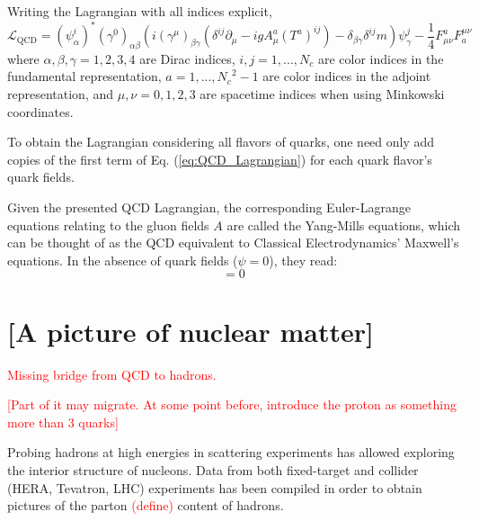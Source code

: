 Writing the Lagrangian with all indices explicit,
\begin{equation}
	\mathcal{L}_{\text{QCD}} = \left(\psi_\alpha^i \right)^*  \left( \gamma^0  \right)_{\alpha \beta} \left(i \left(\gamma^\mu \right)_{\beta \gamma} \left( \delta^{ij} \partial_\mu - i g A^a_\mu \left( T^a \right)^{ij} \right) - \delta_{\beta \gamma} \delta^{ij} m \right) \psi_\gamma^j - \frac{1}{4} F_{\mu \nu}^a F^{\mu \nu}_a
	\label{eq:QCD_Lagrangian_Indices}
\end{equation}
where $\alpha, \beta, \gamma = 1,2,3,4$ are Dirac indices, $i,j=1, ..., N_c$ are color indices in the fundamental representation, $a = 1, ..., {N_c}^2-1$ are color indices in the adjoint representation, and $\mu,\nu = 0,1,2,3$ are spacetime indices when using Minkowski coordinates.

To obtain the Lagrangian considering all flavors of quarks, one need only add copies of the first term of Eq. (\ref{eq:QCD_Lagrangian}) for each quark flavor's quark fields.

Given the presented QCD Lagrangian, the corresponding Euler-Lagrange equations relating to the gluon fields $A$ are called the Yang-Mills equations, which can be thought of as the QCD equivalent to Classical Electrodynamics' Maxwell's equations.
In the absence of quark fields ($\psi=0$), they read:
\begin{equation}
	[D_\mu, F^{\mu \nu}] = 0
	\label{eq:homogenous_Yang-Mills}
\end{equation}

\section{[A picture of nuclear matter]}
\label{sec:nuclear_matter}

\textcolor{red}{Missing bridge from QCD to hadrons.}

\textcolor{red}{[Part of it may migrate. At some point before, introduce the proton as something more than 3 quarks]}

Probing hadrons at high energies in scattering experiments has allowed exploring the interior structure of nucleons. Data from  both fixed-target and collider (HERA, Tevatron, LHC) experiments has been compiled in order to obtain pictures of the parton \textcolor{red}{(define)} content of hadrons.

